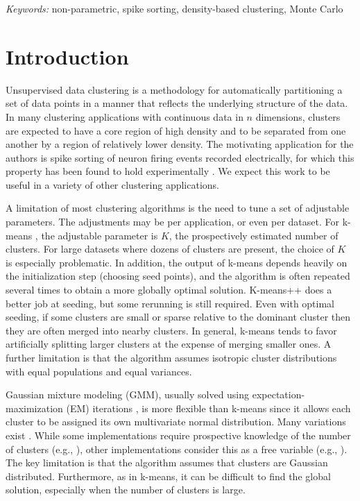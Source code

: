 \documentclass[10pt]{article}
\begin{document}
\noindent%
{\it Keywords:}  non-parametric, spike sorting, density-based clustering, Monte Carlo
\vfill

\newpage
{} %

\section {Introduction}

Unsupervised data clustering is a methodology for automatically partitioning a set of data points in a manner that reflects the underlying structure of the data. In many clustering applications with continuous data in $n$ dimensions, clusters are expected to have a core region of high density and to be separated from one another by a region of relatively lower density. The motivating application for the authors is spike sorting of neuron firing events recorded electrically, for which this property has been found to hold experimentally \cite{tiganj,vargas}. We expect this work to be useful in a variety of other clustering applications.

A limitation of most clustering algorithms is the need to tune a set of adjustable parameters. The adjustments may be per application, or even per dataset. For k-means \cite{kmeans}, the adjustable parameter is $K$, the prospectively estimated number of clusters. For large datasets where dozens of clusters are present, the choice of $K$ is especially problematic. In addition, the output of k-means depends heavily on the initialization step (choosing seed points), and the algorithm is often repeated several times to obtain a more globally optimal solution. K-means++ \cite{kmeanspp} does a better job at seeding, but some rerunning is still required. Even with optimal seeding, if some clusters are small or sparse relative to the dominant cluster then they are often merged into nearby clusters. In general, k-means tends to favor artificially splitting larger clusters at the expense of merging smaller ones. A further limitation is that the algorithm assumes isotropic cluster distributions with equal populations and equal variances.

Gaussian mixture modeling (GMM), usually solved using expectation-maximization (EM) iterations \cite{em}, is more flexible than k-means since it allows each cluster to be assigned its own multivariate normal distribution. Many variations exist \cite[Ch.~11]{murphy}. While some implementations require prospective knowledge of the number of clusters (e.g., \cite[Ch.~8]{mixturemodels}), other implementations consider this as a free variable (e.g., \cite{roberts1998bayesian}). The key limitation is that the algorithm assumes that clusters are Gaussian distributed. Furthermore, as in k-means, it can be difficult to find the global solution, especially when the number of clusters is large.
\end{document}
